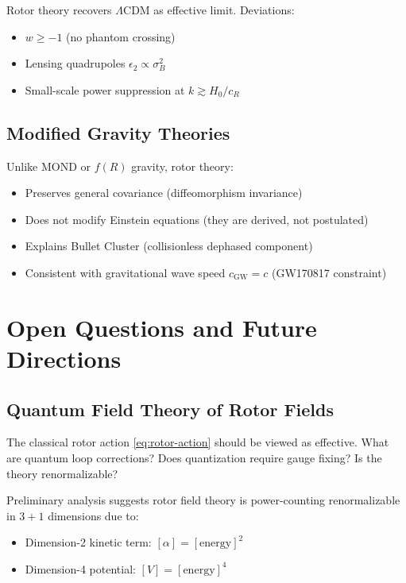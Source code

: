 \documentclass[11pt,a4paper]{article}
\numberwithin{equation}{section}
\theoremstyle{plain}
\theoremstyle{definition}
\theoremstyle{remark}
\begin{document}
Rotor theory recovers $\Lambda$CDM as effective limit. Deviations:
\begin{itemize}
\item $w \geq -1$ (no phantom crossing)
\item Lensing quadrupoles $\epsilon_2 \propto \sigma_B^2$
\item Small-scale power suppression at $k \gtrsim H_0/c_R$
\end{itemize}

\subsection{Modified Gravity Theories}

Unlike MOND or $f(R)$ gravity, rotor theory:
\begin{itemize}
\item Preserves general covariance (diffeomorphism invariance)
\item Does not modify Einstein equations (they are derived, not postulated)
\item Explains Bullet Cluster (collisionless dephased component)
\item Consistent with gravitational wave speed $c_{\mathrm{GW}} = c$ (GW170817 constraint)
\end{itemize}

\section{Open Questions and Future Directions}
\label{sec:future}

\subsection{Quantum Field Theory of Rotor Fields}

The classical rotor action \eqref{eq:rotor-action} should be viewed as effective. What are quantum loop corrections? Does quantization require gauge fixing? Is the theory renormalizable?

Preliminary analysis suggests rotor field theory is power-counting renormalizable in $3+1$ dimensions due to:
\begin{itemize}
\item Dimension-2 kinetic term: $[\alpha] = [\mathrm{energy}]^2$
\item Dimension-4 potential: $[V] = [\mathrm{energy}]^4$
\end{itemize}
\end{document}
